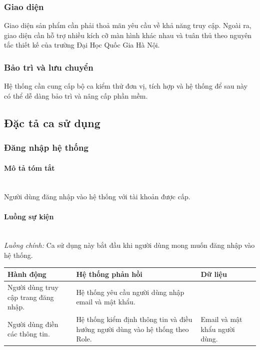 \documentclass[./../main.tex]{subfiles}
\begin{document}
\hypertarget{giao-diux1ec7n}{%
	\subsubsection{Giao diện}\label{giao-diux1ec7n}}

Giao diện sản phẩm cần phải thoả mãn yêu cầu về khả năng truy cập. Ngoài
ra, giao diện cần hỗ trợ nhiều kích cỡ màn hình khác nhau và tuân thủ
theo nguyên tắc thiết kế của trường Đại Học Quốc Gia Hà Nội.

\hypertarget{bux1ea3o-truxec-vuxe0-lux1b0u-chuyux1ec3n}{%
	\subsubsection{Bảo trì và lưu
		chuyển}\label{bux1ea3o-truxec-vuxe0-lux1b0u-chuyux1ec3n}}

Hệ thống cần cung cấp bộ ca kiểm thử đơn vị, tích hợp và hệ thống để sau
này có thể dễ dàng bảo trì và nâng cấp phần mềm.

\subsection{Đặc tả ca sử dụng}

\hypertarget{ux111ux103ng-nhux1eadp-hux1ec7-thux1ed1ng-1}{%
	\subsubsection{Đăng nhập hệ
		thống}\label{ux111ux103ng-nhux1eadp-hux1ec7-thux1ed1ng-1}}

\paragraph*{Mô tả tóm tắt} ~\\

Người dùng đăng nhập vào hệ thống với tài khoản được cấp.

\paragraph*{Luồng sự kiện} ~\\

\emph{Luồng chính:} Ca sử dụng này bắt đầu khi người dùng mong muốn đăng
nhập vào hệ thống.

\begin{table}[H]
	\begin{tabularx}{\textwidth}{|X|X|X|}
		\hline
		\textbf{Hành động}                         & \textbf{Hệ thống phản hồi}                                                                      & \textbf{Dữ liệu}                   \\ \hline
		Người dùng truy cập trang đăng nhập. & Hệ thống yêu cầu người dùng nhập email và mật khẩu.                                   &                                        \\ \hline
		Người dùng điền các thông tin.        & Hệ thống kiểm định thông tin và điều hướng người dùng vào hệ thống theo Role. & Email và mật khẩu người dùng. \\ \hline
	\end{tabularx}
\end{table}
\end{document}
